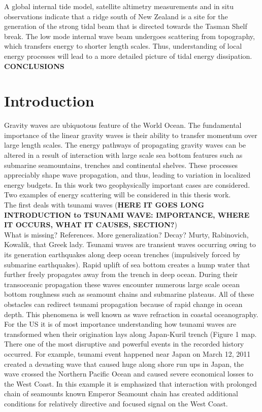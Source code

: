 A global internal tide model, satellite altimetry measurements and in situ observations indicate that a ridge south of New Zealand is a site for the generation of the strong tidal beam that is directed towards the Tasman Shelf break. The low mode internal wave beam undergoes scattering from topography, which transfers energy to shorter length scales. Thus, understanding of local energy processes will lead to a more detailed picture of tidal energy dissipation.\\
\textbf{CONCLUSIONS}

\section{Introduction}
Gravity waves are ubiquotous feature of the World Ocean. The fundamental importance of the linear gravity waves is their ability to transfer momentum over large length scales. The energy pathways of propagating gravity waves can be altered in a result of interaction with large scale sea bottom features such as submarine seamountains, trenches and continental shelves. These processes appreciably shape wave propagation, and thus, leading to variation in localized energy budgets. In this work two geophysically important cases are considered. Two examples of energy scattering will be considered in this thesis work.\\
The first deals with tsunami waves (\textbf{HERE IT GOES LONG INTRODUCTION to TSUNAMI WAVE: IMPORTANCE, WHERE IT OCCURS, WHAT IT CAUSES, SECTION?})\\
What is missing? References. More generalization? Decay? Murty, Rabinovich, Kowalik, that Greek lady.
Tsunami waves are transient waves occurring owing to its generation earthquakes along deep ocean trenches (impulsively forced by submarine earthquakes). Rapid uplift of sea bottom creates a hump water that further freely propagates away from the trench in deep ocean. During their transoceanic propagation these waves encounter numerous large scale ocean bottom roughness such as seamount chains and submarine plateaus. All of these obstacles can redirect tsunami propagation because of rapid change in ocean depth. This phenomena is well known as wave refraction in coastal oceanography.\\
For the US it is of most importance understanding how tsunami waves are transformed when their origination lays along Japan-Kuril trench (Figure 1 map. There one of the most disruptive and powerful events in the recorded history occurred. For example, tsunami event happened near Japan on March 12, 2011 created a devasting wave that caused huge along shore run ups in Japan, the wave crossed the Northern Pacific Ocean and caused severe economical losses to the West Coast. In this example it is emphasized that interaction with prolonged chain of seamounts known Emperor Seamount chain has created additional conditions for relatively directive and focused signal on the West Coast.\\

